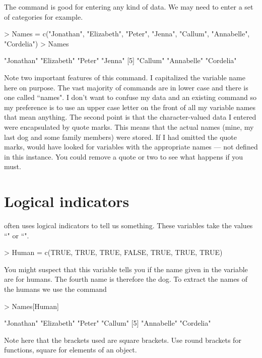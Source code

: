 The  command is good for entering any kind of data. We may need to enter a set of categories for example. 
\begin{Schunk}
\begin{Sinput}
> Names = c("Jonathan", "Elizabeth", "Peter", "Jenna", "Callum", "Annabelle", "Cordelia") 
> Names 
\end{Sinput}
\begin{Soutput}
[1] "Jonathan"  "Elizabeth" "Peter"     "Jenna"    
[5] "Callum"    "Annabelle" "Cordelia" 
\end{Soutput}
\end{Schunk}
Note two important features of this command. I capitalized the variable name here on purpose. The vast majority of \R{} commands are in lower case and there is one called ``names". I don't want to confuse my data and an existing \R{} command so my preference is to use an upper case letter on the front of all my variable names that mean anything. The second point is that the character-valued data I entered were encapsulated by quote marks. This means that the actual names (mine, my last dog and some family members) were stored. If I had omitted the quote marks, \R{} would have looked for variables with the appropriate names --- not defined in this instance. You could remove a quote or two to see what happens if you must. 
 
\section{Logical indicators} 
 
\R{} often uses logical indicators to tell us something. These variables take the values ``" or ``". 
 
\begin{Schunk}
\begin{Sinput}
> Human = c(TRUE, TRUE, TRUE, FALSE, TRUE, TRUE, TRUE) 
\end{Sinput}
\end{Schunk}
You might suspect that this variable tells you if the name given in the  variable are for humans. The fourth name is therefore the dog. To extract the names of the humans we use the command 
\begin{Schunk}
\begin{Sinput}
> Names[Human] 
\end{Sinput}
\begin{Soutput}
[1] "Jonathan"  "Elizabeth" "Peter"     "Callum"   
[5] "Annabelle" "Cordelia" 
\end{Soutput}
\end{Schunk}
Note here that the brackets used are square brackets. Use round brackets for functions, square for elements of an object. 
 
